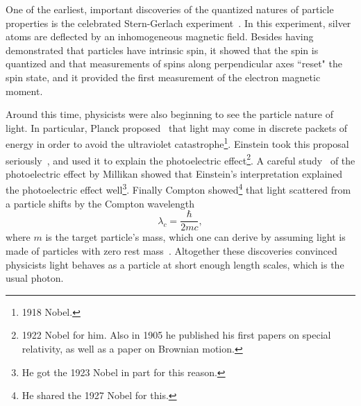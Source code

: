 One of the earliest, important discoveries of the quantized natures of particle
properties is the celebrated Stern-Gerlach
experiment~\cite{gerlach_experimentelle_1922a,gerlach_magnetische_1922b,gerlach_experimentelle_1922c}. 
In this experiment, silver atoms
are deflected by an inhomogeneous magnetic field.
Besides having demonstrated that particles have intrinsic spin, it showed that
the spin is quantized and that measurements of spins along perpendicular axes
``reset" the spin state, and it provided the first measurement of the electron
magnetic moment.


Around this time, physicists were also beginning to see the particle nature of
light. In particular, Planck proposed~\cite{Planck:1901tja} 
that light may come in discrete packets of
energy in order to avoid the ultraviolet 
catastrophe\footnote{1918 Nobel.}.
Einstein took this proposal seriously~\cite{Einstein:1905cc}, 
and used it to explain the photoelectric
effect\footnote{1922 Nobel for him. Also in 1905 he published his first
papers on special relativity, as well as a paper on Brownian motion.}. 
A careful study~\cite{millikan_direct_1916} of the photoelectric effect by 
Millikan showed that
Einstein's interpretation explained the photoelectric effect well\footnote{He
got the 1923 Nobel in part for this reason.}. Finally
Compton showed\footnote{He shared the 1927 Nobel for this.} 
that light scattered from a particle shifts by the Compton
wavelength
\begin{equation}
  \lambda_c=\frac{\hbar}{2mc},
\end{equation}
where $m$ is the target particle's mass, which one can derive by assuming light
is made of particles with zero rest mass~\cite{Compton:1923zz}.
Altogether these discoveries convinced physicists light behaves as a particle
at short enough length scales, which is the usual photon.


